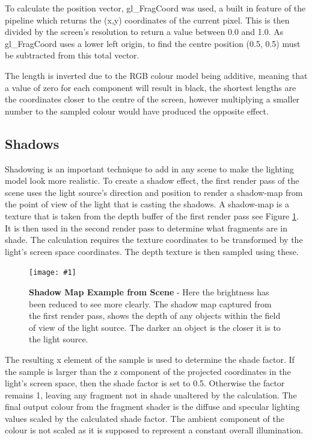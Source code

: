 \documentclass[conference]{acmsiggraph}
\newcommand{\figuremacroW}[4]{
\begin{figure}[h] %
	\centering
	\texttt{[image: \#1]}
	\caption[#2]{\textbf{#2} - #3}
	\label{fig:#1}
\end{figure}
}
\begin{document}
To calculate the position vector, gl\_FragCoord was used, a built in feature of the pipeline which returns the (x,y) coordinates of the current pixel. This is then divided by the screen's resolution to return a value between 0.0 and 1.0. As gl\_FragCoord uses a lower left origin, to find the centre position (0.5, 0.5) must be subtracted from this total vector.

The length is inverted due to the RGB colour model being additive, meaning that a value of zero for each component will result in black, the shortest lengths are the coordinates closer to the centre of the screen, however multiplying a smaller number to the sampled colour would have produced the opposite effect.
	
\subsection{Shadows}

Shadowing is an important technique to add in any scene to make the lighting model look more realistic. To create a shadow effect, the first render pass of the scene uses the light source's direction and position to render a shadow-map from the point of view of the light that is casting the shadows. A shadow-map is a texture that is taken from the depth buffer of the first render pass see Figure \ref{fig:shadowMap}. It is then used in the second render pass to determine what fragments are in shade. The calculation requires the texture coordinates to be transformed by the light's screen space coordinates. The depth texture is then sampled using these.

\figuremacroW
{shadowMap}
{Shadow Map Example from Scene}
{Here the brightness has been reduced to see more clearly. The shadow map captured from the first render pass, shows the depth of any objects within the field of view of the light source. The darker an object is the closer it is to the light source.}
{1.0}

The resulting x element of the sample is used to determine the shade factor. If the sample is larger than the z component of the projected coordinates in the light's screen space, then the shade factor is set to 0.5. Otherwise the factor remains 1, leaving any fragment not in shade unaltered by the calculation. The final output colour from the fragment shader is the diffuse and specular lighting values scaled by the calculated shade factor. The ambient component of the colour is not scaled as it is supposed to represent a constant overall illumination.
\end{document}
